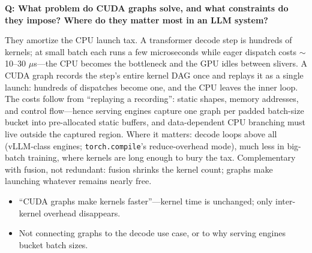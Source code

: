 \begin{interviewq}
\textbf{Q: What problem do CUDA graphs solve, and what constraints do they impose? Where do they matter most in an LLM system?}

 \quad {} \quad \badgefreq{\freqlow}

\stronganswer They amortize the CPU launch tax. A transformer decode step is hundreds of kernels; at small batch each runs a few microseconds while eager dispatch costs $\sim$10--30 $\mu$s---the CPU becomes the bottleneck and the GPU idles between slivers. A CUDA graph records the step's entire kernel DAG once and replays it as a single launch: hundreds of dispatches become one, and the CPU leaves the inner loop. The costs follow from ``replaying a recording'': static shapes, memory addresses, and control flow---hence serving engines capture one graph per padded batch-size bucket into pre-allocated static buffers, and data-dependent CPU branching must live outside the captured region. Where it matters: decode loops above all (vLLM-class engines; \texttt{torch.compile}'s reduce-overhead mode), much less in big-batch training, where kernels are long enough to bury the tax. Complementary with fusion, not redundant: fusion shrinks the kernel count; graphs make launching whatever remains nearly free.

\redflags
\begin{itemize}
    \item ``CUDA graphs make kernels faster''---kernel time is unchanged; only inter-kernel overhead disappears.
    \item Not connecting graphs to the decode use case, or to why serving engines bucket batch sizes.
\end{itemize}


\end{interviewq}

